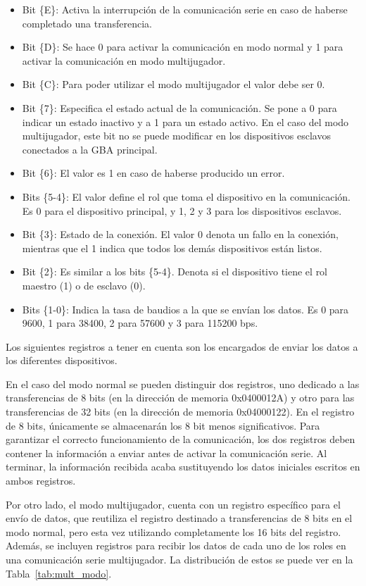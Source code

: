 \begin{itemize}
	\item Bit \{E\}: Activa la interrupción de la comunicación serie en caso de haberse completado una transferencia.
	\item Bit \{D\}: Se hace 0 para activar la comunicación en modo normal y 1 para activar la comunicación en modo multijugador.
	\item Bit \{C\}: Para poder utilizar el modo multijugador el valor debe ser 0.
	\item Bit \{7\}: Especifica el estado actual de la comunicación. Se pone a 0 para indicar un estado inactivo y a 1 para un estado activo. En el caso del modo multijugador, este bit no se puede modificar en los dispositivos esclavos conectados a la GBA principal.
	\item Bit \{6\}: El valor es 1 en caso de haberse producido un error.
	\item Bits \{5-4\}: El valor define el rol que toma el dispositivo en la comunicación. Es 0 para el dispositivo principal, y 1, 2 y 3 para los dispositivos esclavos.
	\item Bit \{3\}: Estado de la conexión. El valor 0 denota un fallo en la conexión, mientras que el 1 indica que todos los demás dispositivos están listos. 
	\item Bit \{2\}: Es similar a los bits \{5-4\}. Denota si el dispositivo tiene el rol maestro (1) o de esclavo (0).
	\item Bits \{1-0\}: Indica la tasa de baudios a la que se envían los datos. Es 0 para 9600, 1 para 38400, 2 para 57600 y 3 para 115200 bps.
\end{itemize}

Los siguientes registros a tener en cuenta son los encargados de enviar los datos a los diferentes dispositivos.  

En el caso del modo normal se pueden distinguir dos registros, uno dedicado a las transferencias de 8 bits (en la dirección de memoria 0x0400012A) y otro para las transferencias de 32 bits (en la dirección de memoria 0x04000122). En el registro de 8 bits, únicamente se almacenarán los 8 bit menos significativos. Para garantizar el correcto funcionamiento de la comunicación, los dos registros deben contener la información a enviar antes de activar la comunicación serie. Al terminar, la información recibida acaba sustituyendo los datos iniciales escritos en ambos registros.

Por otro lado, el modo multijugador, cuenta con un registro específico para el envío de datos, que reutiliza el registro destinado a transferencias de 8 bits en el modo normal, pero esta vez utilizando completamente los 16 bits del registro. Además, se incluyen registros para recibir los datos de cada uno de los roles en una comunicación serie multijugador. La distribución de estos se puede ver en la Tabla~\ref{tab:mult_modo}.

